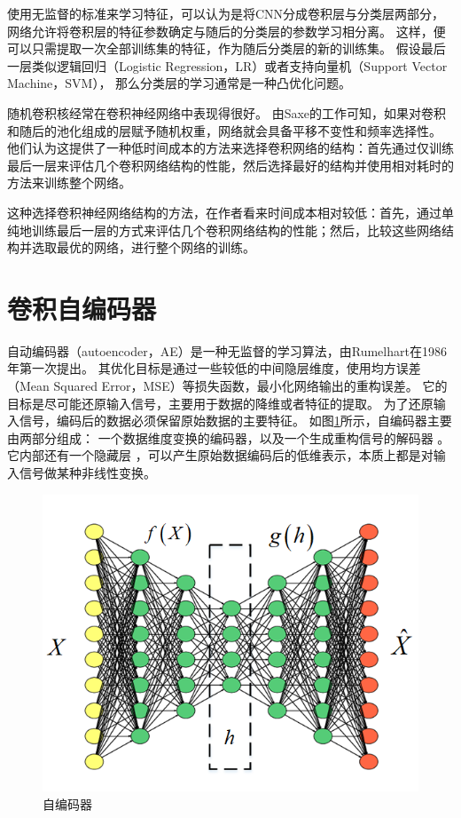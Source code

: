 使用无监督的标准来学习特征，可以认为是将CNN分成卷积层与分类层两部分，
网络允许将卷积层的特征参数确定与随后的分类层的参数学习相分离。
这样，便可以只需提取一次全部训练集的特征，作为随后分类层的新的训练集。
假设最后一层类似逻辑回归（Logistic Regression，LR）或者支持向量机（Support Vector Machine，SVM），
那么分类层的学习通常是一种凸优化问题。\par
随机卷积核经常在卷积神经网络中表现得很好。
由Saxe的工作可知，如果对卷积和随后的池化组成的层赋予随机权重，网络就会具备平移不变性和频率选择性\cite{saxe2011random}。
他们认为这提供了一种低时间成本的方法来选择卷积网络的结构：首先通过仅训练最后一层来评估几个卷积网络结构的性能，然后选择最好的结构并使用相对耗时的方法来训练整个网络。

这种选择卷积神经网络结构的方法，在作者看来时间成本相对较低：首先，通过单纯地训练最后一层的方式来评估几个卷积网络结构的性能；然后，比较这些网络结构并选取最优的网络，进行整个网络的训练。


\section{卷积自编码器}

自动编码器（autoencoder，AE）是一种无监督的学习算法，由Rumelhart在1986年第一次提出\cite{rumelhart1986learning}。
其优化目标是通过一些较低的中间隐层维度，使用均方误差（Mean Squared Error，MSE）等损失函数，最小化网络输出的重构误差。
它的目标是尽可能还原输入信号，主要用于数据的降维或者特征的提取。
为了还原输入信号，编码后的数据必须保留原始数据的主要特征。
如图\ref{sec:fig_2_5}所示，自编码器主要由两部分组成：
一个数据维度变换的编码器，以及一个生成重构信号的解码器 。
它内部还有一个隐藏层 ，可以产生原始数据编码后的低维表示，本质上都是对输入信号做某种非线性变换。\par
\begin{figure}[!h]
	\centering
	\includegraphics[scale=0.7]{figures/chapter_2/fig_2_5}
	\caption{自编码器}	\label{sec:fig_2_5}
\end{figure}

